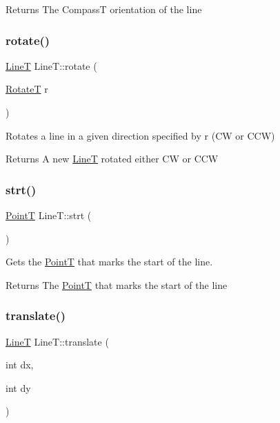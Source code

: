 \begin{DoxyReturn}{Returns}
The CompassT orientation of the line 
\end{DoxyReturn}
\mbox{\label{class_line_t_a427979474891765018a3a30f458313a3}} 
\subsubsection{\texorpdfstring{rotate()}{rotate()}}
{\footnotesize\ttfamily \mbox{\hyperlink{class_line_t}{LineT}} Line\+T\+::rotate (\begin{DoxyParamCaption}\item[{\mbox{\hyperlink{_map_types_8h_a86e9c41121ebe1e27666eb8a30668ffb}{RotateT}}}]{r }\end{DoxyParamCaption})}



Rotates a line in a given direction specified by r (CW or C\+CW) 

\begin{DoxyReturn}{Returns}
A new \mbox{\hyperlink{class_line_t}{LineT}} rotated either CW or C\+CW 
\end{DoxyReturn}
\mbox{\label{class_line_t_a786eea84b67064264d3e70e5c820a134}} 
\subsubsection{\texorpdfstring{strt()}{strt()}}
{\footnotesize\ttfamily \mbox{\hyperlink{class_point_t}{PointT}} Line\+T\+::strt (\begin{DoxyParamCaption}{ }\end{DoxyParamCaption})}



Gets the \mbox{\hyperlink{class_point_t}{PointT}} that marks the start of the line. 

\begin{DoxyReturn}{Returns}
The \mbox{\hyperlink{class_point_t}{PointT}} that marks the start of the line 
\end{DoxyReturn}
\mbox{\label{class_line_t_a3c70c0e1f35f2966f61b840af34cbd5a}} 
\subsubsection{\texorpdfstring{translate()}{translate()}}
{\footnotesize\ttfamily \mbox{\hyperlink{class_line_t}{LineT}} Line\+T\+::translate (\begin{DoxyParamCaption}\item[{int}]{dx,  }\item[{int}]{dy }\end{DoxyParamCaption})}



